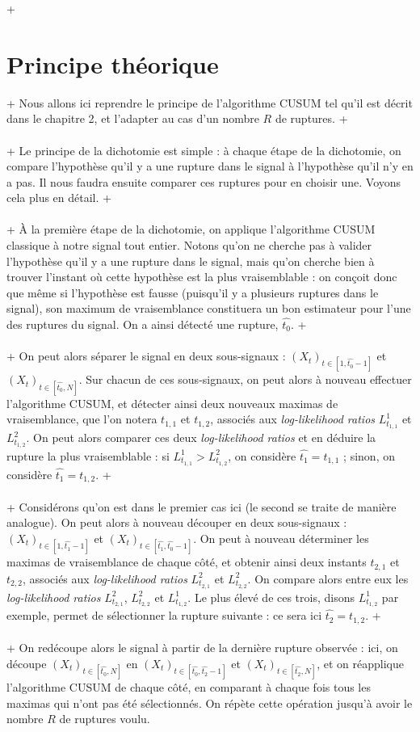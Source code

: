 \documentclass[french,11pt,notitlepage]{report}
\begin{document}
	 +	\section{Principe théorique}
	 +	Nous allons ici reprendre le principe de l'algorithme CUSUM tel qu'il est décrit dans le chapitre 2, et l'adapter au cas d'un nombre $R$ de ruptures.
	 +	\\ \\
	 +	Le principe de la dichotomie est simple : à chaque étape de la dichotomie, on compare l'hypothèse qu'il y a une rupture dans le signal à l'hypothèse qu'il n'y en a pas. Il nous faudra ensuite comparer ces ruptures pour en choisir une. Voyons cela plus en détail.
	 +	\\ \\
	 +	À la première étape de la dichotomie, on applique l'algorithme CUSUM classique à notre signal tout entier. Notons qu'on ne cherche pas à valider l'hypothèse qu'il y a une rupture dans le signal, mais qu'on cherche bien à trouver l'instant où cette hypothèse est la plus vraisemblable : on conçoit donc que même si l'hypothèse est fausse (puisqu'il y a plusieurs ruptures dans le signal), son maximum de vraisemblance constituera un bon estimateur pour l'une des ruptures du signal. On a ainsi détecté une rupture, $\hat{t_0}$.
	 +	\\ \\
	 +	On peut alors séparer le signal en deux sous-signaux : $(X_t)_{t \in [1, \hat{t_0}-1]}$ et $(X_t)_{t \in [\hat{t_0}, N]}$. Sur chacun de ces sous-signaux, on peut alors à nouveau effectuer l'algorithme CUSUM, et détecter ainsi deux nouveaux maximas de vraisemblance, que l'on notera $t_{1,1}$ et $t_{1,2}$, associés aux \textit{log-likelihood ratios} $L_{t_{1,1}}^1$ et $L_{t_{1,2}}^2$. On peut alors comparer ces deux \textit{log-likelihood ratios} et en déduire la rupture la plus vraisemblable : si $L_{t_{1,1}}^1 > L_{t_{1,2}}^2$, on considère $\hat{t_1} = t_{1,1}$ ; sinon, on considère $\hat{t_1} = t_{1,2}$.
	 +	\\ \\
	 +	Considérons qu'on est dans le premier cas ici (le second se traite de manière analogue). On peut alors à nouveau découper en deux sous-signaux : $(X_t)_{t \in [1, \hat{t_1}-1]}$ et $(X_t)_{t \in [\hat{t_1}, \hat{t_0}-1]}$. On peut à nouveau déterminer les maximas de vraisemblance de chaque côté, et obtenir ainsi deux instants $t_{2,1}$ et $t_{2,2}$, associés aux \textit{log-likelihood ratios} $L_{t_{2,1}}^2$ et $L_{t_{2,2}}^2$. On compare alors entre eux les \textit{log-likelihood ratios} $L_{t_{2,1}}^2$, $L_{t_{2,2}}^2$ et $L_{t_{1,2}}^1$. Le plus élevé de ces trois, disons $L_{t_{1,2}}^1$ par exemple, permet de sélectionner la rupture suivante : ce sera ici $\hat{t_2} = t_{1,2}$.
	 +	\\ \\
	 +	On redécoupe alors le signal à partir de la dernière rupture observée : ici, on découpe $(X_t)_{t \in [\hat{t_0}, N]}$ en $(X_t)_{t \in [\hat{t_0}, \hat{t_2}-1]}$ et $(X_t)_{t \in [\hat{t_2}, N]}$, et on réapplique l'algorithme CUSUM de chaque côté, en comparant à chaque fois tous les maximas qui n'ont pas été sélectionnés. On répète cette opération jusqu'à avoir le nombre $R$ de ruptures voulu.
\end{document}
